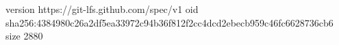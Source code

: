 version https://git-lfs.github.com/spec/v1
oid sha256:4384980c26a2df5ea33972c94b36f812f2cc4dcd2ebecb959c46fc6628736cb6
size 2880
